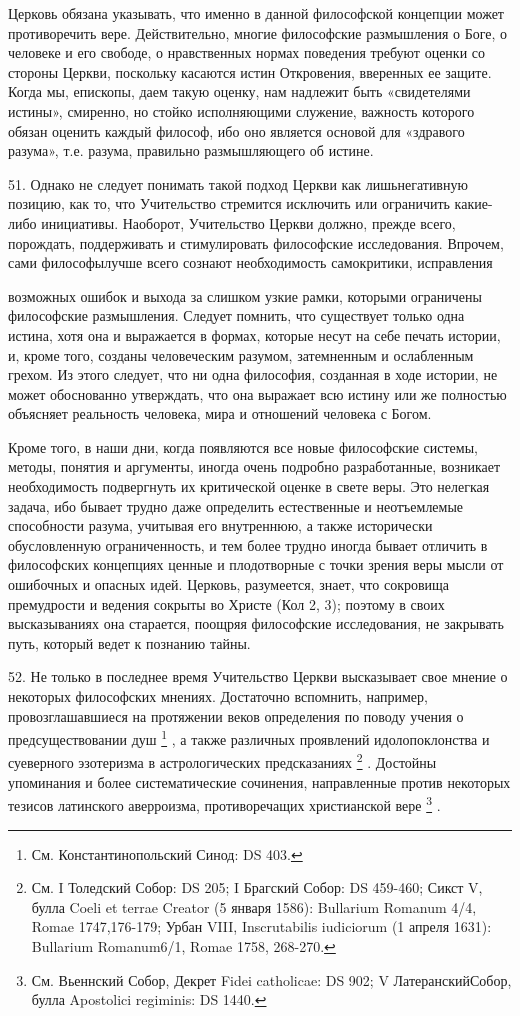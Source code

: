 \documentclass[a5paper,10pt]{article}
\begin{document}
Церковь обязана указывать, что именно в данной философской концепции может
противоречить вере. Действительно, многие философские размышления о Боге, о
человеке и его свободе, о нравственных нормах поведения требуют оценки со
стороны Церкви, поскольку касаются истин Откровения, вверенных ее защите. Когда
мы, епископы, даем такую оценку, нам надлежит быть «свидетелями истины»,
смиренно, но стойко исполняющими служение, важность которого обязан оценить
каждый философ, ибо оно является основой для «здравого разума», т.е. разума,
правильно размышляющего об истине.

51. Однако не следует понимать такой подход Церкви как лишьнегативную позицию,
как то, что Учительство стремится исключить или ограничить какие-либо
инициативы. Наоборот, Учительство Церкви должно, прежде всего, порождать,
поддерживать и стимулировать философские исследования. Впрочем, сами
философылучше всего сознают необходимость самокритики, исправления

возможных ошибок и выхода за слишком узкие рамки, которыми ограничены
философские размышления. Следует помнить, что существует только одна истина,
хотя она и выражается в формах, которые несут на себе печать истории, и, кроме
того, созданы человеческим разумом, затемненным и ослабленным грехом. Из этого
следует, что ни одна философия, созданная в ходе истории, не может обоснованно
утверждать, что она выражает всю истину или же полностью объясняет реальность
человека, мира и отношений человека с Богом.

Кроме того, в наши дни, когда появляются все новые философские системы, методы,
понятия и аргументы, иногда очень подробно разработанные, возникает
необходимость подвергнуть их критической оценке в свете веры. Это нелегкая
задача, ибо бывает трудно даже определить естественные и неотъемлемые
способности разума, учитывая его внутреннюю, а также исторически обусловленную
ограниченность, и тем более трудно иногда бывает отличить в философских
концепциях ценные и плодотворные с точки зрения веры мысли от ошибочных и
опасных идей. Церковь, разумеется, знает, что сокровища премудрости и ведения
сокрыты во Христе (Кол 2, 3); поэтому в своих высказываниях она старается,
поощряя философские исследования, не закрывать путь, который ведет к познанию
тайны.

52. Не только в последнее время Учительство Церкви высказывает свое мнение о
некоторых философских мнениях. Достаточно вспомнить, например,
провозглашавшиеся на протяжении веков определения по поводу учения о
предсуществовании душ \footnote{См. Константинопольский Синод: DS 403.}  , а
также различных проявлений идолопоклонства и суеверного эзотеризма в
астрологических предсказаниях \footnote{См. I Толедский Собор: DS 205; I
    Брагский Собор: DS 459-460; Сикст V, булла Coeli et terrae Creator (5
    января 1586): Bullarium Romanum 4/4, Romae 1747,176-179; Урбан VIII,
Inscrutabilis iudiciorum (1 апреля 1631): Bullarium Romanum6/1, Romae 1758,
268-270.}  .  Достойны упоминания и более систематические сочинения,
направленные против некоторых тезисов латинского аверроизма, противоречащих
христианской вере \footnote{См. Вьеннский Собор, Декрет Fidei catholicae: DS
902; V ЛатеранскийСобор, булла Apostolici regiminis: DS 1440.}  .
\end{document}
